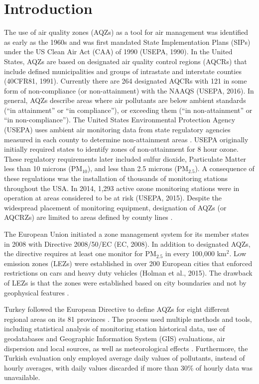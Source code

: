 \section{Introduction}
The use of air quality zones (AQZs) as a tool for air management was identified as early as the 1960s \citep{Breivogel1961, Holland1960} and was first mandated State Implementation Plans (SIPs) under the US Clean Air Act (CAA) of 1990 (USEPA, 1990). In the United States, AQZs are based on designated air quality control regions (AQCRs) that include defined municipalities and groups of intrastate and interstate counties (40CFR81, 1991). Currently there are 264 designated AQCRs with 121 in some form of non-compliance (or non-attainment) with the NAAQS (USEPA, 2016). In general, AQZs describe areas where air pollutants are below ambient standards (“in attainment” or “in compliance”), or exceeding them (“in non-attainment” or “in non-compliance”).  The United States Environmental Protection Agency (USEPA) uses ambient air monitoring data from state regulatory agencies measured in each county to determine non-attainment areas \citep{Carr2012}.  USEPA originally initially required states to identify zones of non-attainment for 8 hour ozone.  These regulatory requirements later included sulfur dioxide, Particulate Matter less than 10 microns (PM$_{10}$), and less than 2.5 microns (PM$_{2.5}$).  A consequence of these regulations was the installation of thousands of monitoring stations throughout the USA.  In 2014, 1,293 active ozone monitoring stations were in operation at areas considered to be at risk (USEPA, 2015).  Despite the widespread placement of monitoring equipment, designation of AQZs (or AQCRZs) are limited to areas defined by county lines \citep{Carr2012}.

The European Union initiated a zone management system for its member states in 2008 with Directive 2008/50/EC (EC, 2008).  In addition to designated AQZs, the directive requires at least one monitor for PM$_{2.5}$ in every 100,000 km$^{2}$.  Low emission zones (LEZs) were established in over 200 European cities that enforced restrictions on cars and heavy duty vehicles (Holman et al., 2015).  The drawback of LEZs is that the zones were established based on city boundaries and not by geophysical features \citep{Henschel2013}.

Turkey followed the European Directive to define AQZs for  eight different regional areas on its 81 provinces \citep{CYGM2010}.  The process used multiple methods and tools, including statistical analysis of monitoring station historical data, use of geodatabases and Geographic Information System (GIS) evaluations, air dispersion and local sources, as well as meteorological effects \citep{Karaca2012}.  Furthermore, the Turkish evaluation only employed average daily values of pollutants, instead of hourly averages, with daily values discarded if more than 30\% of hourly data was unavailable.  

